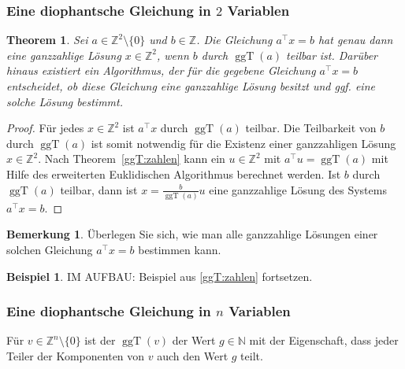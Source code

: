 \documentclass[
a4paper,landscape,16pt,
bibliography=totocnumbered,
numbers=noenddot,
]{scrartcl}
\numberwithin{equation}{subsection}
\newcommand{\N}{\mathbb N}
\newcommand{\Z}{\mathbb Z}
\newcommand{\ggT}{\operatorname{ggT}} %
\theoremstyle{plain}
\newtheorem*{thm}{Theorem}
\theoremstyle{definition}
\newtheorem*{bsp}{Beispiel}
\newtheorem*{bem}{Bemerkung}
\begin{document}
\subsubsection{Eine diophantsche Gleichung in $2$ Variablen} 

\begin{thm} 
	Sei $a \in \Z^2 \setminus \{0\}$ und $b \in \Z$. Die Gleichung $a^\top x = b$ hat genau dann eine ganzzahlige Lösung $x \in \Z^2$, wenn $b$ durch $\ggT(a)$ teilbar ist. Darüber hinaus existiert ein Algorithmus, der für die gegebene Gleichung $a^\top x = b$ entscheidet, ob diese Gleichung eine ganzzahlige Lösung besitzt und ggf. eine solche Lösung bestimmt. 
\end{thm} 
\begin{proof} 
	Für jedes $x \in \Z^2$ ist $a^\top x$ durch $\ggT(a)$ teilbar. Die Teilbarkeit von $b$ durch $\ggT(a)$ ist somit notwendig für die Existenz einer ganzzahligen Lösung $x \in \Z^2$. Nach Theorem~\ref{ggT:zahlen} kann ein  $u \in \Z^2$ mit $a^\top u = \ggT(a)$ mit Hilfe des erweiterten Euklidischen Algorithmus berechnet werden. Ist $b$ durch $\ggT(a)$ teilbar, dann ist $ x= \frac{b}{\ggT(a)} u$ eine ganzzahlige Lösung des Systems $a^\top x = b$. 
\end{proof} 

\begin{bem}
	Überlegen Sie sich, wie man alle ganzzahlige Lösungen einer solchen Gleichung $a^\top x = b$ bestimmen kann. 
\end{bem} 

\begin{bsp} 
	IM AUFBAU: Beispiel aus \ref{ggT:zahlen} fortsetzen. 
\end{bsp} 

\subsubsection{Eine diophantsche Gleichung in  $n$ Variablen} 

Für $v \in \Z^n \setminus \{0\}$ ist der $\ggT(v)$ der Wert $g \in \N$ mit der Eigenschaft, dass jeder Teiler der Komponenten von $v$ auch den Wert $g$ teilt. 
\end{document}

